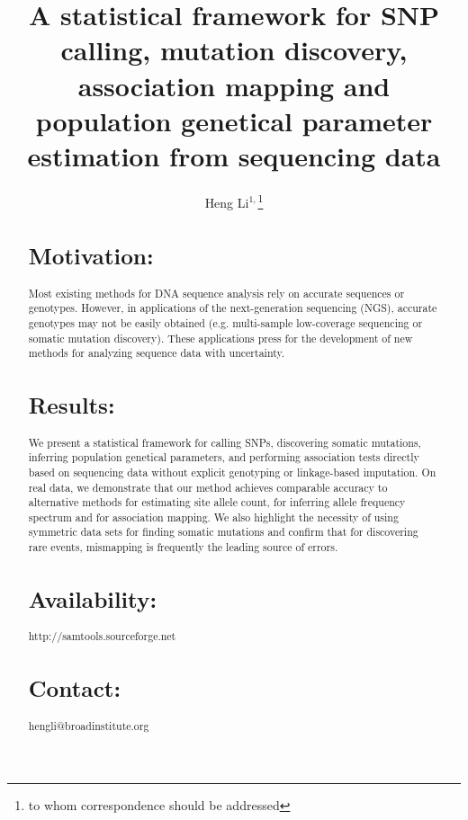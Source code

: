\documentclass{bioinfo}
\begin{document}

\title[Inference using sequencing data]{A statistical framework for SNP calling, mutation discovery,
		association mapping and population genetical parameter estimation from sequencing data}

\author[Li]{Heng Li$^{1,}$\footnote{to whom correspondence should be addressed}}

\address{$^1$Broad Institute, 7 Cambridge Center, Cambridge, MA 02142, USA}

\maketitle

\begin{abstract}
\section{Motivation:}
Most existing methods for DNA sequence analysis rely on accurate sequences or
genotypes.  However, in applications of the next-generation sequencing (NGS),
accurate genotypes may not be easily obtained (e.g. multi-sample
low-coverage sequencing or somatic mutation discovery).
These applications press for the development of new methods for analyzing
sequence data with uncertainty.
\section{Results:}
We present a statistical framework for calling SNPs, discovering somatic
mutations, inferring population genetical parameters, and performing
association tests directly based on sequencing data without explicit genotyping
or linkage-based imputation. On real data, we demonstrate that our method
achieves comparable accuracy to alternative methods for estimating site allele
count, for inferring allele frequency spectrum and for association mapping. We
also highlight the necessity of using symmetric data sets for finding somatic
mutations and confirm that for discovering rare events, mismapping is
frequently the leading source of errors.
\section{Availability:} http://samtools.sourceforge.net
\section{Contact:} hengli@broadinstitute.org
\end{abstract}
\end{document}

